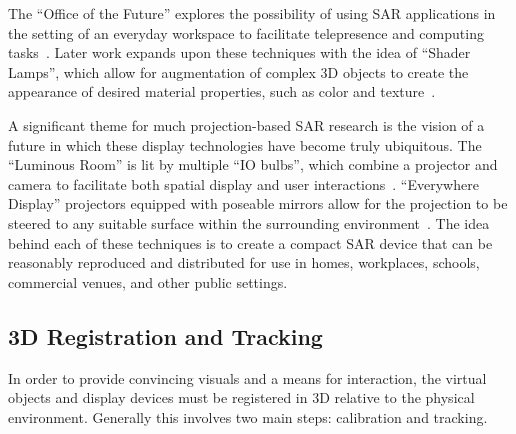 \documentclass[review]{vgtc}                 %
\begin{document}
The ``Office of the Future''
explores the possibility of using SAR applications in the setting of
an everyday workspace to facilitate telepresence and computing
tasks~\cite{Raskar1998a,Raskar1998b}.  
Later work expands upon these techniques with the idea of ``Shader
Lamps'', which allow for augmentation of complex 3D objects to create
the appearance of desired material properties, such as color and
texture~\cite{Raskar2000}.

A significant theme for much projection-based SAR research is the
vision of a future in which these display technologies have become
truly ubiquitous.  
The ``Luminous Room'' is lit by multiple ``IO bulbs'', which combine a
projector and camera to facilitate both spatial display and user
interactions~\cite{Underkoffler1999}.  
``Everywhere Display'' projectors equipped with poseable mirrors allow
for the projection to be steered to any suitable surface within the
surrounding environment~\cite{Pinhanez2001}.  The idea behind each of
these techniques is to create a compact SAR device that can be
reasonably reproduced and distributed for use in homes, workplaces,
schools, commercial venues, and other public settings.



\subsection{3D Registration and Tracking}

In order to provide convincing visuals and a means for interaction,
the virtual objects and display devices must be registered in 3D
relative to the physical environment.  Generally this involves two
main steps: calibration and tracking.

\end{document}
